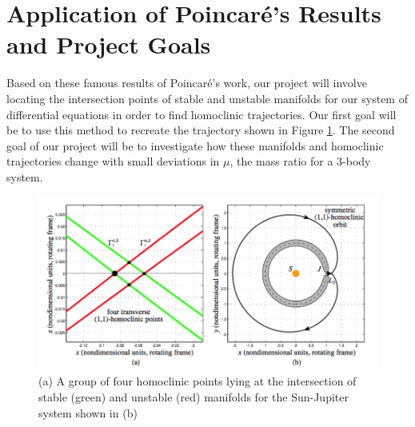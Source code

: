 \documentclass[12pt]{article} %
\begin{document}
\section*{Application of Poincaré's Results and Project Goals} 
Based on these famous results of Poincaré's work, our project will involve locating the intersection points of stable and unstable manifolds for our system of differential equations in order to find homoclinic trajectories. Our first goal will be to use this method to recreate the trajectory shown in Figure \ref{fig:homoclinicPoints}. The second goal of our project will be to investigate how these manifolds and homoclinic trajectories change with small deviations in $\mu$, the mass ratio for a 3-body system.
\begin{figure}[H]
\centering
\includegraphics[scale=0.4]{homoclinicPoints.png}\nonumber
\caption{(a) A group of four homoclinic points lying at the intersection of stable (green) and unstable (red) manifolds for the Sun-Jupiter system shown in (b) \cite{KoonLoMarsdenRoss2011}}
\label{fig:homoclinicPoints}
\end{figure}


\newpage


\end{document}
